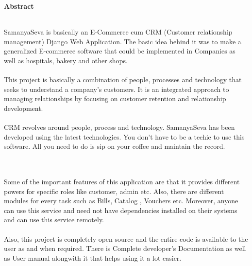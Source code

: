 \begin{center}
{\Huge \bf{Abstract}\vskip 0.2in}
\end{center}
 \hrulefill \\

SamanyaSeva is basically an E-Commerce cum CRM (Customer relationship management) Django Web Application.
The basic idea behind it was to make a generalized E-commerce software that could be implemented in Companies as well as hospitals, bakery and other shops.\\\\
This project is basically a combination of people, processes and technology that seeks to understand a company's customers. It is an integrated approach to managing relationships by focusing on customer retention and relationship development.\\\\
CRM revolves around people, process and technology. SamanyaSeva has been developed using the latest technologies. You don't have to be a techie to use this software. All you need to do is sip on your coffee and maintain the record.\\\\\

Some of the important features of this application are that it provides different powers for specific roles like customer, admin etc.
Also, there are different modules for every task such as Bills, Catalog , Vouchers etc.
Moreover, anyone can use this service and need not have dependencies installed on their systems and can use this service 
remotely.\\\\
Also, this project is completely open source and the entire code is available 
to the user as and when required. There is Complete developer's 
Documentation as well as User manual alongwith it that helps using it a lot easier.


